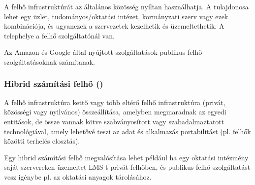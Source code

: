 A felhő infrastruktúrát az általános közösség nyíltan használhatja. A tulajdonosa lehet egy üzlet, tudományos/oktatási intézet, kormányzati szerv vagy ezek kombinációja, és ugyanezek a szervezetek kezelhetik és üzemeltethetik. A telephelye a felhő szolgáltatónál van.

Az Amazon és Google által nyújtott szolgáltatások publikus felhő szolgáltatásoknak számítanak.

\subsubsection{Hibrid számítási felhő ()}

A felhő infrastruktúra kettő vagy több eltérő felhő infrastruktúra (privát, közösségi vagy nyilvános) összeállítása, amelyben megmaradnak az egyedi entitások, de össze vannak kötve szabványosított vagy szabadalmaztatott technológiával, amely lehetővé teszi az adat és alkalmazás portabilitást (pl. felhők közötti terhelés elosztás).

Egy hibrid számítási felhő megvalósítása lehet például ha egy oktatási intézmény saját szervereken üzemeltet LMS-t privát felhőben, és publikus felhő szolgáltatást vesz igénybe pl. az oktatási anyagok tárolásához. 